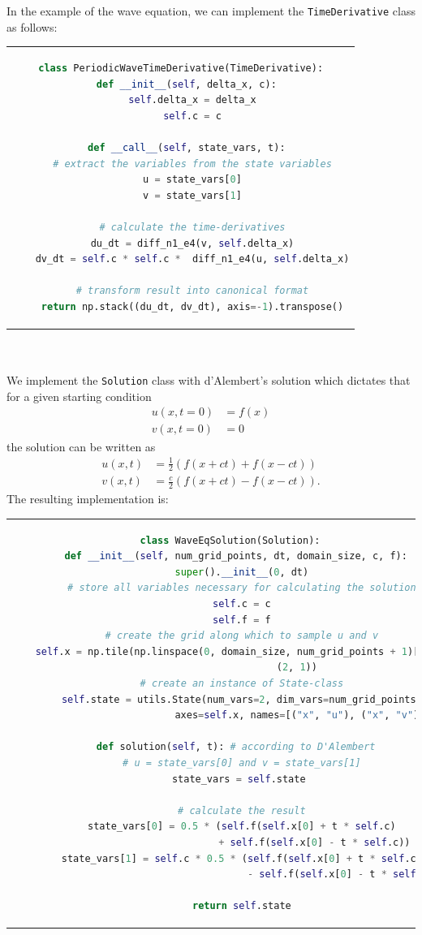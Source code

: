 \noindent
In the example of the wave equation, we can implement the \texttt{TimeDerivative} class as follows:\\
\begin{tabular}{c}
\begin{lstlisting}[language=Python]
class PeriodicWaveTimeDerivative(TimeDerivative):
  def __init__(self, delta_x, c):
    self.delta_x = delta_x
    self.c = c

  def __call__(self, state_vars, t):
    # extract the variables from the state variables
    u = state_vars[0]
    v = state_vars[1]
			
    # calculate the time-derivatives
    du_dt = diff_n1_e4(v, self.delta_x)
    dv_dt = self.c * self.c *  diff_n1_e4(u, self.delta_x)
        	
    # transform result into canonical format
    return np.stack((du_dt, dv_dt), axis=-1).transpose()
\end{lstlisting}
\end{tabular}
\\\\
We implement the \texttt{Solution} class with d'Alembert's solution which dictates that for a given starting condition
\begin{align*}
u(x,t=0) &= f(x)\\
v(x,t=0) &= 0
\end{align*}
the solution can be written as
\begin{align*}
u(x,t) &= \frac{1}{2}(f(x+ct)+f(x-ct))\\
v(x,t) &= \frac{c}{2}(f(x+ct)-f(x-ct)).
\end{align*}
The resulting implementation is:\\
\begin{tabular}{c}
\begin{lstlisting}[language=Python]
class WaveEqSolution(Solution):
  def __init__(self, num_grid_points, dt, domain_size, c, f):
    super().__init__(0, dt)
    # store all variables necessary for calculating the solution
    self.c = c
    self.f = f
    # create the grid along which to sample u and v
    self.x = np.tile(np.linspace(0, domain_size, num_grid_points + 1)[:-1],
                       (2, 1))
    # create an instance of State-class
    self.state = utils.State(num_vars=2, dim_vars=num_grid_points,
                         axes=self.x, names=[("x", "u"), ("x", "v")])

  def solution(self, t): # according to D'Alembert
    # u = state_vars[0] and v = state_vars[1]
    state_vars = self.state 
        
    # calculate the result
    state_vars[0] = 0.5 * (self.f(self.x[0] + t * self.c)
                             + self.f(self.x[0] - t * self.c))
    state_vars[1] = self.c * 0.5 * (self.f(self.x[0] + t * self.c)
                                       - self.f(self.x[0] - t * self.c))

    return self.state
\end{lstlisting}
\end{tabular}
